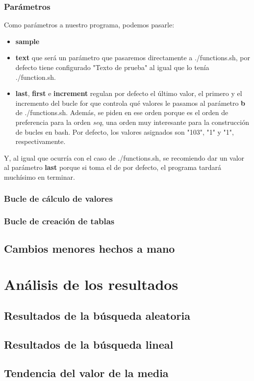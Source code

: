 \documentclass[a4paper, 11pt]{article}
\begin{document}
		\subsubsection{Parámetros}
			Como parámetros a nuestro programa, podemos pasarle:
			\begin{itemize}
				\item \textbf{sample}
				
				\item \textbf{text} que será un parámetro que pasaremos directamente a ./functions.sh, por defecto tiene
				configurado "Texto de prueba" al igual que lo tenía ./function.sh.

				\item \textbf{last}, \textbf{first} e \textbf{increment} regulan por defecto el último valor, el primero y
				el incremento del bucle for que controla qué valores le pasamos al parámetro \textbf{b} de ./functions.sh.
				Además, se piden en ese orden porque es el orden de preferencia para la orden \textit{seq}, una orden muy
				interesante para la construcción de bucles en bash. Por defecto, los valores asignados son "103", "1" y
				"1", respectivamente.
			\end{itemize}
			
			Y, al igual que ocurría con el caso de ./functions.sh, se recomiendo dar un valor al parámetro \textbf{last}
			porque si toma el de por defecto, el programa tardará muchísimo en terminar.
			
		\subsubsection{Bucle de cálculo de valores}
		\subsubsection{Bucle de creación de tablas}

	\subsection{Cambios menores hechos a mano}

\section{Análisis de los resultados}
	\subsection{Resultados de la búsqueda aleatoria}
	\subsection{Resultados de la búsqueda lineal}
	\subsection{Tendencia del valor de la media}
\end{document}
